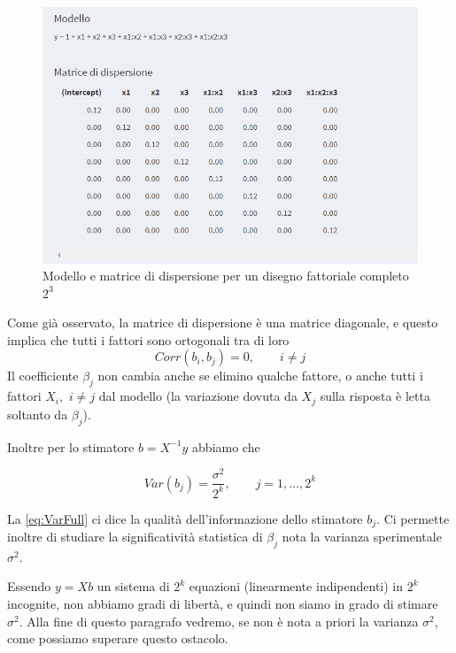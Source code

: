 \documentclass[
  11pt,
]{book}
\begin{document}
\begin{figure}

{\centering \includegraphics[width=1\linewidth]{Immagini/Fatt_compl/03_matr_disp} 

}

\caption{Modello e matrice di dispersione per un disegno fattoriale completo $2^3$}\label{fig:fc3}
\end{figure}

Come già osservato, la matrice di dispersione è una matrice diagonale, e
questo implica che tutti i fattori sono ortogonali tra di loro
\[
Corr(b_i,b_j)=0, \qquad i\neq j
\]
Il coefficiente \(\beta_j\) non cambia anche se elimino qualche
fattore, o anche tutti i fattori \(X_i,\) \(i\neq j\) dal modello (la
variazione dovuta da \(X_j\) sulla risposta è letta soltanto da
\(\beta_j\)).

Inoltre per lo stimatore \(b=X^{-1}y\) abbiamo che

\begin{equation}
Var(b_j)=\frac{\sigma^2}{2^k},
\qquad j=1,\dots,2^k 
\label{eq:VarFull}
\end{equation}

La \eqref{eq:VarFull} ci dice la qualità dell'informazione dello
stimatore \(b_j\). Ci permette inoltre di studiare la significatività
statistica di \(\beta_j\) nota la varianza sperimentale \(\sigma^2\).

Essendo \(y=Xb\) un sistema di \(2^k\) equazioni (linearmente indipendenti)
in \(2^k\) incognite, non abbiamo gradi di libertà, e quindi non siamo in
grado di stimare \(\sigma^2\). Alla fine di questo paragrafo vedremo, se
non è nota a priori la varianza \(\sigma^2\), come possiamo superare
questo ostacolo.
\end{document}
